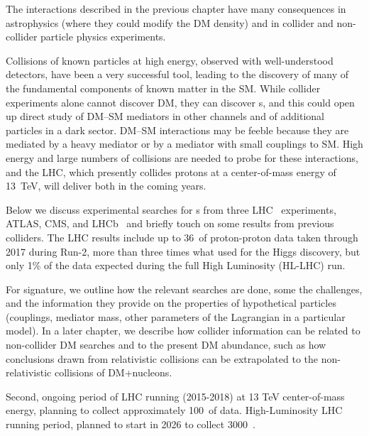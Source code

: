 The interactions described in the previous chapter have many consequences in astrophysics (where they could modify the DM density) and in collider and non-collider particle physics experiments.

Collisions of known particles at high energy, observed with well-understood detectors, have been a very successful tool, leading to the discovery of many of the fundamental components of known matter in the SM. 
While collider experiments alone cannot discover DM, they can discover {\IP}s, and this could open up direct study of DM--SM mediators in other channels and of additional particles in a dark sector. 
DM--SM interactions may be feeble because they are mediated by a heavy mediator or by a mediator with small couplings to SM.
High energy and large numbers of collisions are needed to probe for these interactions, and the LHC, which presently collides protons at a center-of-mass energy of 13~TeV, will deliver both in the coming years. 

Below we discuss experimental searches for {\IP}s from three LHC~\cite{LHC2008} experiments, ATLAS, CMS, and LHCb~\cite{ATLAS2008,CMS2008,LHCb2008} and briefly touch on some results from previous colliders.
The LHC results include up to 36~\ifb of proton-proton data taken through 2017 during Run-2, more than three times what used for the Higgs discovery, but only 1\% of the data expected during the full High Luminosity (HL-LHC) run.

For signature, we outline how the relevant searches are done, some the challenges, and the information they provide on the properties of hypothetical particles (couplings, mediator mass, other parameters of the Lagrangian in a particular model). 
In a later chapter, we describe how collider information can be related to non-collider DM searches and to the present DM abundance, such as how conclusions drawn from relativistic collisions can be extrapolated to the non-relativistic collisions of DM+nucleons. 

\begin{marginnote}[]
 {Second, ongoing period of LHC running (2015-2018) at 13 TeV center-of-mass energy, planning to collect approximately 100~\ifb of data.}
 {High-Luminosity LHC running period, planned to start in 2026 to collect 3000~\ifb.}
\end{marginnote}

